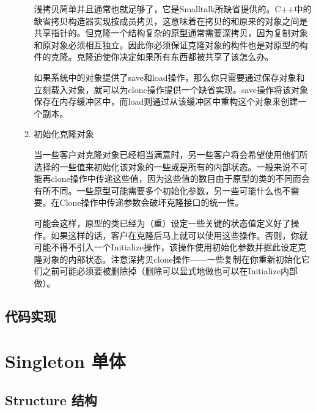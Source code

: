 \begin{enumerate}
\begin{enumerate}
	  浅拷贝简单并且通常也就足够了，它是Smalltalk所缺省提供的。C++中的缺省拷贝构造器实现按成员拷贝，这意味着在拷贝的和原来的对象之间是共享指针的。但克隆一个结构复杂的原型通常需要深拷贝，因为复制对象和原对象必须相互独立。因此你必须保证克隆对象的构件也是对原型的构件的克隆。克隆迫使你决定如果所有东西都被共享了该怎么办。

 	  如果系统中的对象提供了save和load操作，那么你只需要通过保存对象和立刻载入对象，就可以为clone操作提供一个缺省实现。save操作将该对象保存在内存缓冲区中，而load则通过从该缓冲区中重构这个对象来创建一个副本。

	  \item 初始化克隆对象

	  当一些客户对克隆对象已经相当满意时，另一些客户将会希望使用他们所选择的一些值来初始化该对象的一些或是所有的内部状态。一般来说不可能再clone操作中传递这些值，因为这些值的数目由于原型的类的不同而会有所不同。一些原型可能需要多个初始化参数，另一些可能什么也不需要。在Clone操作中传递参数会破坏克隆接口的统一性。

	  可能会这样，原型的类已经为（重）设定一些关键的状态值定义好了操作。如果这样的话，客户在克隆后马上就可以使用这些操作。否则，你就可能不得不引入一个Initialize操作，该操作使用初始化参数并据此设定克隆对象的内部状态。注意深拷贝clone操作——一些复制在你重新初始化它们之前可能必须要被删除掉（删除可以显式地做也可以在Initialize内部做）。

	  \end{enumerate}

\end{enumerate}

\subsection{代码实现}


\section{Singleton 单体}

\subsection{Structure 结构}

